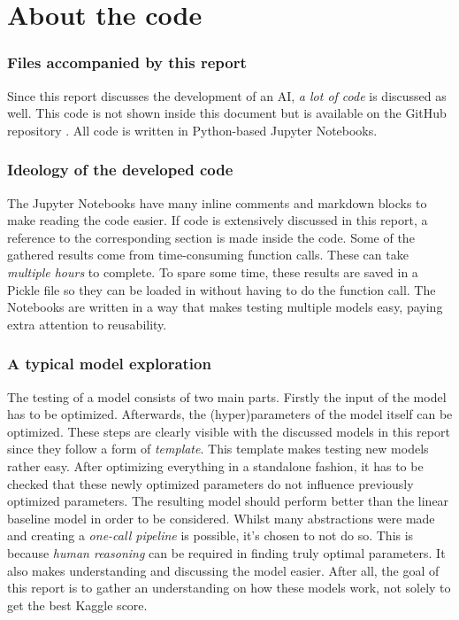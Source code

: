\part{About the code}
\label{part:about_the_code}


\section{Files accompanied by this report}
\label{section:inc_files}
Since this report discusses the development of an AI, \textit{a lot of code} is discussed as well.
This code is not shown inside this document but is available on the GitHub repository \citep{github_project}.
All code is written in Python-based Jupyter Notebooks.



\section{Ideology of the developed code}
\label{section:ideology_dev_code}
The Jupyter Notebooks have many inline comments and markdown blocks to make reading the code easier.
If code is extensively discussed in this report, a reference to the corresponding section is made inside the code. 
Some of the gathered results come from time-consuming function calls.
These can take \textit{multiple hours} to complete.
To spare some time, these results are saved in a Pickle file so they can be loaded in without having to do the function call.
The Notebooks are written in a way that makes testing multiple models easy, paying extra attention to reusability. 


\section{A typical model exploration}
\label{section:typical_model_exploration}
The testing of a model consists of two main parts.
Firstly the input of the model has to be optimized.
Afterwards, the (hyper)parameters of the model itself can be optimized.
These steps are clearly visible with the discussed models in this report since they follow a form of \emph{template}.
This template makes testing new models rather easy.
After optimizing everything in a standalone fashion, it has to be checked that these newly optimized parameters do not influence previously optimized parameters.
The resulting model should perform better than the linear baseline model in order to be considered.
Whilst many abstractions were made and creating a \emph{one-call pipeline} is possible, it's chosen to not do so.
This is because \textit{human reasoning} can be required in finding truly optimal parameters.
It also makes understanding and discussing the model easier.
After all, the goal of this report is to gather an understanding on how these models work, not solely  to get the best Kaggle score.

